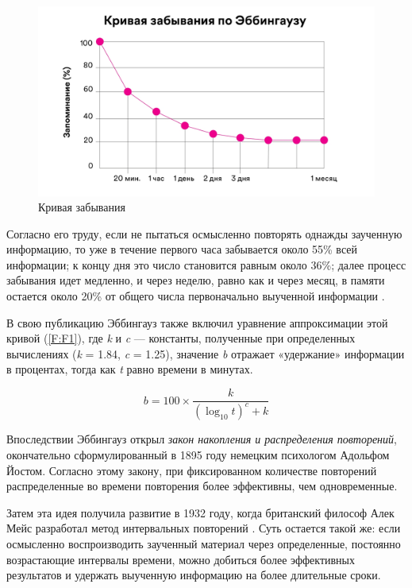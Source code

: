 \begin{figure}
  \centering
  \includegraphics[width=\textwidth]{figures/curve}
  \caption{Кривая забывания}
  \label{fig:curve}
\end{figure}

Согласно его труду, если не пытаться осмысленно повторять однажды заученную информацию, то уже в течение первого часа забывается около 55\% всей информации; к концу дня это число становится равным около 36\%; далее процесс забывания идет медленно, и через неделю, равно как и через месяц, в памяти остается около 20\% от общего числа первоначально выученной информации \cite{ebbinghaus}.

В свою публикацию Эббингауз также включил уравнение аппроксимации этой кривой (\ref{F:F1}), где \textit{k} и \textit{c} — константы, полученные при определенных вычислениях (\textit{k} = 1.84, \textit{c} = 1.25), значение \textit{b} отражает «удержание» информации в процентах, тогда как \textit{t} равно времени в минутах.

\begin{equation}
b = 100 \times \frac{k}{{(\log_{10} t)}^c + k}
\label{F:F1}
\end{equation}

Впоследствии Эббингауз открыл \textit{закон накопления и распределения повторений}, окончательно сформулированный в 1895 году немецким психологом Адольфом Йостом. Согласно этому закону, при фиксированном количестве повторений распределенные во времени повторения более эффективны, чем одновременные.

Затем эта идея получила развитие в 1932 году, когда британский философ Алек Мейс разработал метод интервальных повторений \cite{mace}. Суть остается такой же: если осмысленно воспроизводить заученный материал через определенные, постоянно возрастающие интервалы времени, можно добиться более эффективных результатов и удержать выученную информацию на более длительные сроки.


